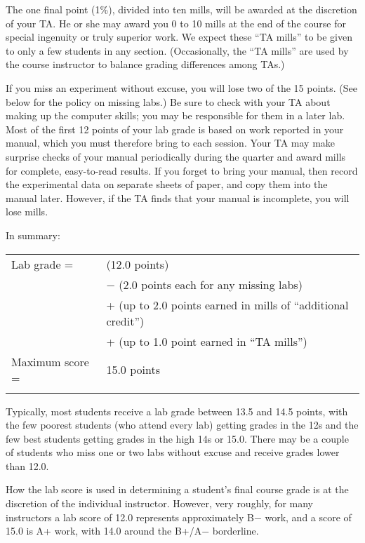 The one final point (1\%), divided into ten mills, will be awarded at the discretion of your TA.  He or she may award you 0 to 10 mills at the end of the course for special ingenuity or truly superior work.  We expect these ``TA mills'' to be given to only a few students in any section.  (Occasionally, the ``TA mills'' are used by the course instructor to balance grading differences among TAs.)

If you miss an experiment without excuse, you will lose two of the 15 points.  (See below for the policy on missing labs.)  Be sure to check with your TA about making up the computer skills; you may be responsible for them in a later lab.  Most of the first 12 points of your lab grade is based on work reported in your manual, which you must therefore bring to each session.  Your TA may make surprise checks of your manual periodically during the quarter and award mills for complete, easy-to-read results.  If you forget to bring your manual, then record the experimental data on separate sheets of paper, and copy them into the manual later.  However, if the TA finds that your manual is incomplete, you will lose mills.

In summary:
\begin{center}\begin{tabular}{ p{3.5cm} l }
 Lab grade =     & (12.0 points)   \\\tstrut\bstrut
                 & \(-\) (2.0 points each for any missing labs)  \\\tstrut\bstrut
                 & + (up to 2.0 points earned in mills of ``additional credit'')  \\\tstrut\bstrut
                 & + (up to 1.0 point earned in ``TA mills'')  \\\tstrut\bstrut
 Maximum score = & 15.0 points   \\\tstrut\bstrut
\end{tabular}
\end{center}

Typically, most students receive a lab grade between 13.5 and 14.5 points, with the few poorest students (who attend every lab) getting grades in the 12s and the few best students getting grades in the high 14s or 15.0.  There may be a couple of students who miss one or two labs without excuse and receive grades lower than 12.0.

How the lab score is used in determining a student's final course grade is at the discretion of the individual instructor. However, very roughly, for many instructors a lab score of 12.0 represents approximately B\(-\) work, and a score of 15.0 is A+ work, with 14.0 around the B+/A\(-\) borderline.

